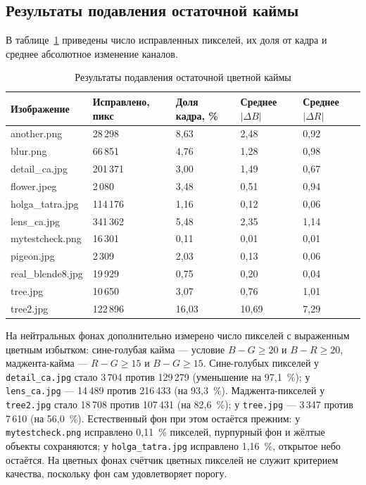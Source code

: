 \documentclass[a4paper,14pt,oneside]{extreport}
\begin{document}
\subsection{Результаты подавления остаточной каймы}

В таблице~\ref{tab:defringe} приведены число исправленных пикселей, их доля
от кадра и среднее абсолютное изменение каналов.

\begin{table}[H]
\caption{Результаты подавления остаточной цветной каймы}
\label{tab:defringe}
\small
\begin{tabular}{|p{3.3cm}|p{2.3cm}|p{1.9cm}|p{2.6cm}|p{2.6cm}|}
\hline
Изображение & Исправлено, пикс & Доля кадра, \% & Среднее $|\Delta B|$ & Среднее $|\Delta R|$ \\
\hline
another.png & 28\,298 & 8,63 & 2,48 & 0,92 \\
\hline
blur.png & 66\,851 & 4,76 & 1,28 & 0,98 \\
\hline
detail\_ca.jpg & 201\,371 & 3,00 & 1,49 & 0,67 \\
\hline
flower.jpeg & 2\,080 & 3,48 & 0,51 & 0,94 \\
\hline
holga\_tatra.jpg & 114\,176 & 1,16 & 0,12 & 0,06 \\
\hline
lens\_ca.jpg & 341\,362 & 5,48 & 2,35 & 1,14 \\
\hline
mytestcheck.png & 16\,301 & 0,11 & 0,01 & 0,01 \\
\hline
pigeon.jpg & 2\,309 & 2,03 & 0,13 & 0,06 \\
\hline
real\_blende8.jpg & 19\,929 & 0,75 & 0,20 & 0,04 \\
\hline
tree.jpg & 10\,650 & 3,07 & 0,76 & 1,01 \\
\hline
tree2.jpg & 122\,896 & 16,03 & 10,69 & 7,29 \\
\hline
\end{tabular}
\end{table}

На нейтральных фонах дополнительно измерено число пикселей с выраженным
цветным избытком: сине-голубая кайма --- условие $B-G\ge20$ и
$B-R\ge20$, маджента-кайма --- $R-G\ge15$ и $B-G\ge15$. Сине-голубых
пикселей у \texttt{detail\_ca.jpg} стало 3\,704 против 129\,279 (уменьшение
на 97,1~\%); у \texttt{lens\_ca.jpg} --- 14\,489 против 216\,433
(на 93,3~\%). Маджента-пикселей у \texttt{tree2.jpg} стало 18\,708 против
107\,431 (на 82,6~\%); у \texttt{tree.jpg} --- 3\,347 против 7\,610
(на 56,0~\%). Естественный фон при этом остаётся прежним: у
\texttt{mytestcheck.png} исправлено 0,11~\% пикселей, пурпурный фон и жёлтые
объекты сохраняются; у \texttt{holga\_tatra.jpg} исправлено 1,16~\%,
открытое небо остаётся. На цветных фонах счётчик цветных пикселей не служит
критерием качества, поскольку фон сам удовлетворяет порогу.
\end{document}
